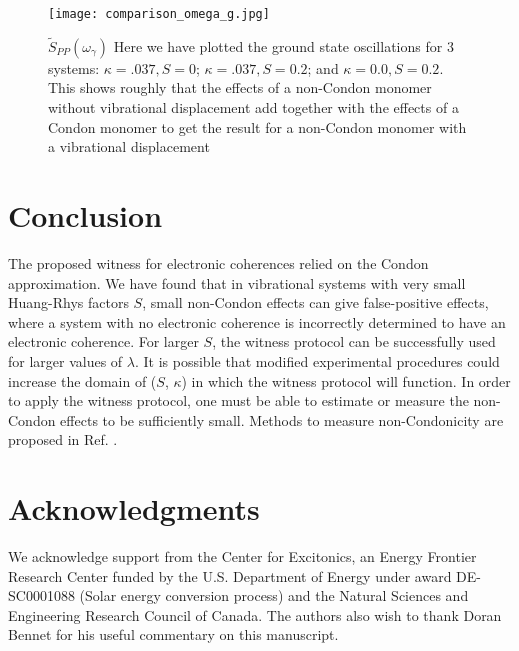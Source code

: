 \begin{figure}
   \texttt{[image: comparison\_omega\_g.jpg]}
   \caption{$\tilde{S}_{PP} ( \omega_{\gamma})$ Here we have plotted the ground state oscillations for 3 systems: $\kappa=.037, S=0$; $\kappa=.037, S=0.2$; and $\kappa=0.0, S=0.2$.  This shows roughly that the effects of a non-Condon monomer without vibrational displacement add together with the effects of a Condon monomer to get the result for a non-Condon monomer with a vibrational displacement}
	\label{fig:addedSignals}
\end{figure}




\section{Conclusion}

The proposed witness for electronic coherences \cite{witness,allanWitness} relied on the Condon approximation. We have found that in vibrational systems with very small Huang-Rhys factors $S$, small non-Condon effects can give false-positive effects, where a system with no electronic coherence is incorrectly determined to have an electronic coherence. For larger $S$, the witness protocol can be successfully used for larger values of $\lambda$. It is possible that modified experimental procedures could increase the domain of ($S$, $\kappa$) in which the witness protocol will function. In order to apply the witness protocol, one must be able to estimate or measure the non-Condon effects to be sufficiently small. Methods to measure non-Condonicity are proposed in Ref. \cite{myDetectingNonCondonPaper}.




\section{Acknowledgments}
We acknowledge support from the Center for Excitonics, an Energy Frontier Research Center funded by the U.S. Department of Energy under award DE-SC0001088 (Solar energy conversion process) and the Natural Sciences and Engineering Research Council of Canada.  The authors also wish to thank Doran Bennet for his useful commentary on this manuscript.
